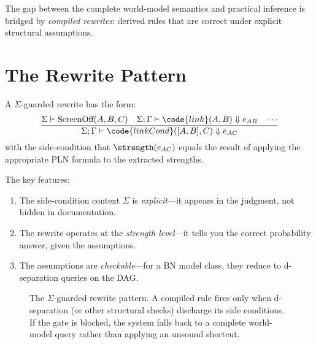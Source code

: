\documentclass[11pt,openany]{report}
\begin{document}
The gap between the complete world-model semantics and practical inference
is bridged by \emph{compiled rewrites}: derived rules that are correct
under explicit structural assumptions.

\section{The Rewrite Pattern}

A $\Sigma$-guarded rewrite has the form:
\[
\frac{\Sigma \vdash \text{ScreenOff}(A, B, C) \quad
      \Sigma; \Gamma \vdash \code{link}(A, B) \Downarrow e_{AB} \quad
      \cdots}
     {\Sigma; \Gamma \vdash \code{linkCond}([A, B], C) \Downarrow e_{AC}}
\]
with the side-condition that $\strength(e_{AC})$ equals the result of
applying the appropriate PLN formula to the extracted strengths.

The key features:
\begin{enumerate}
\item The side-condition context $\Sigma$ is \emph{explicit}---it appears
  in the judgment, not hidden in documentation.
\item The rewrite operates at the \emph{strength level}---it tells you
  the correct probability answer, given the assumptions.
\item The assumptions are \emph{checkable}---for a BN model class, they
  reduce to d-separation queries on the DAG.
\end{enumerate}

\begin{figure}[htbp]
\centering
{}
\caption{The $\Sigma$-guarded rewrite pattern.  A compiled rule fires only
when d-separation (or other structural checks) discharge its side conditions.
If the gate is blocked, the system falls back to a complete world-model query
rather than applying an unsound shortcut.}
\label{fig:sigma-guarded-flow}
\end{figure}
\end{document}
